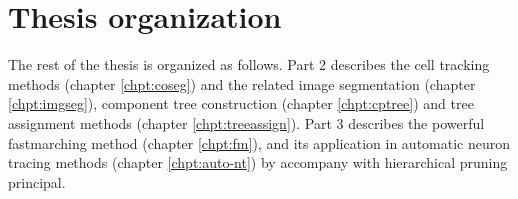 \section{Thesis organization}
The rest of the thesis is organized as follows. Part 2 describes the cell tracking methods (chapter \ref{chpt:coseg}) and the related image segmentation (chapter \ref{chpt:imgseg}), component tree construction (chapter \ref{chpt:cptree}) and tree assignment methods (chapter \ref{chpt:treeassign}). Part 3 describes the powerful fastmarching method (chapter \ref{chpt:fm}), and its application in automatic neuron tracing methods (chapter \ref{chpt:auto-nt}) by accompany with hierarchical pruning principal.

